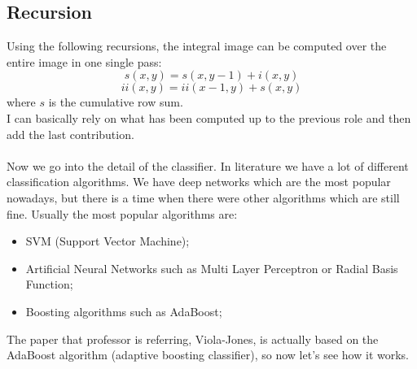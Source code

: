 \subsection{Recursion}
Using the following recursions, the integral image can be computed over the entire image in one single pass:
\[s(x,y)=s(x,y-1)+i(x,y)\]
\[ii(x,y)=ii(x-1,y)+s(x,y)\]
where $s$ is the cumulative row sum.
\\I can basically rely on what has been computed up to the previous role and then add the last contribution.
\\
\\
Now we go into the detail of the classifier. In literature we have a lot of different classification algorithms. We have deep networks which are the most popular nowadays, but there is a time when there were other algorithms which are still fine.
Usually the most popular algorithms are:
\begin{itemize}
    \item SVM (Support Vector Machine);
    \item Artificial Neural Networks such as Multi Layer Perceptron or Radial Basis Function;
    \item Boosting algorithms such as AdaBoost;
\end{itemize}
The paper that professor is referring, Viola-Jones, is actually based on the AdaBoost algorithm (adaptive boosting classifier), so now let's see how it works.
